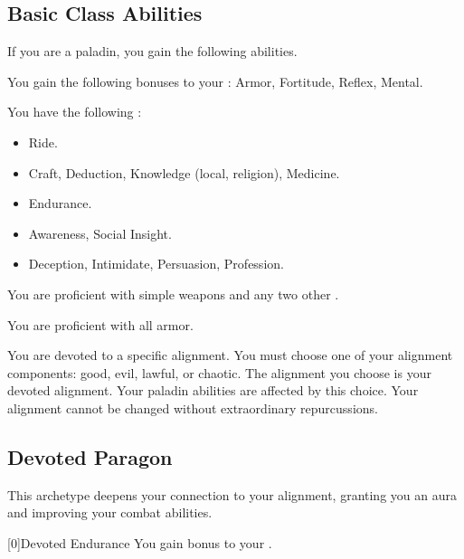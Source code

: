     \subsection{Basic Class Abilities}
        If you are a paladin, you gain the following abilities.

        You gain the following bonuses to your :  Armor,  Fortitude,  Reflex,  Mental.

        You have the following :
        \begin{itemize}
            \item {} Ride.
            \item {} Craft, Deduction, Knowledge (local, religion), Medicine.
            \item {} Endurance.
            \item {} Awareness, Social Insight.
            \item {} Deception, Intimidate, Persuasion, Profession.
        \end{itemize}

        You are proficient with simple weapons and any two other .

        You are proficient with all armor.

        You are devoted to a specific alignment.
        You must choose one of your alignment components: good, evil, lawful, or chaotic.
        The alignment you choose is your devoted alignment.
        Your paladin abilities are affected by this choice.
        Your alignment cannot be changed without extraordinary repurcussions.

    \newpage
    \subsection{Devoted Paragon}
        This archetype deepens your connection to your alignment, granting you an aura and improving your combat abilities.

        [0]{Devoted Endurance} You gain  bonus to your .

